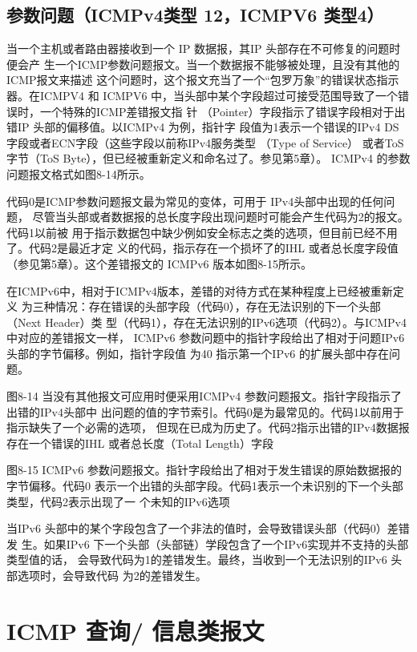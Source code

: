 \subsection{参数问题（ICMPv4类型 12，ICMPV6 类型4）}

当一个主机或者路由器接收到一个 IP 数据报，其IP 头部存在不可修复的问题时便会产
生一个ICMP参数问题报文。当一个数据报不能够被处理，且没有其他的ICMP报文来描述
这个问题时，这个报文充当了一个“包罗万象”的错误状态指示器。在ICMPV4 和 ICMPV6
中，当头部中某个字段超过可接受范围导致了一个错误时，一个特殊的ICMP差错报文指
针 （Pointer）字段指示了错误字段相对于出错IP 头部的偏移值。以ICMPv4 为例，指针字
段值为1表示一个错误的IPv4 DS 字段或者ECN字段（这些字段以前称IPv4服务类型
（Type of Service） 或者ToS 字节（ToS Byte），但已经被重新定义和命名过了。参见第5章）。
ICMPv4 的参数问题报文格式如图8-14所示。

代码0是ICMP参数问题报文最为常见的变体，可用于 IPv4头部中出现的任何问题，
尽管当头部或者数据报的总长度字段出现问题时可能会产生代码为2的报文。代码1以前被
用于指示数据包中缺少例如安全标志之类的选项，但目前已经不用了。代码2是最近才定
义的代码，指示存在一个损坏了的IHL 或者总长度字段值（参见第5章）。这个差错报文的
ICMPv6 版本如图8-15所示。

在ICMPv6中，相对于ICMPv4版本，差错的对待方式在某种程度上已经被重新定义
为三种情况：存在错误的头部字段（代码0），存在无法识别的下一个头部（Next Header）类
型（代码1），存在无法识别的IPv6选项（代码2）。与ICMPv4中对应的差错报文一样，
ICMPv6 参数问题中的指针字段给出了相对于问题IPv6 头部的字节偏移。例如，指针字段值
为40 指示第一个IPv6 的扩展头部中存在问题。

图8-14 当没有其他报文可应用时便采用ICMPv4 参数问题报文。指针字段指示了出错的IPv4头部中
出问题的值的字节索引。代码0是为最常见的。代码1以前用于指示缺失了一个必需的选项，
但现在已成为历史了。代码2指示出错的IPv4数据报存在一个错误的IHL 或者总长度（Total
Length）字段

图8-15 ICMPv6 参数问题报文。指针字段给出了相对于发生错误的原始数据报的字节偏移。代码0
表示一个出错的头部字段。代码1表示一个未识别的下一个头部类型，代码2表示出现了一
个未知的IPv6选项

当IPv6 头部中的某个字段包含了一个非法的值时，会导致错误头部（代码0）差错发
生。如果IPv6 下一个头部（头部链）学段包含了一个IPv6实现并不支持的头部类型值的话，
会导致代码为1的差错发生。最终，当收到一个无法识别的IPv6 头部选项时，会导致代码
为2的差错发生。

\section{ICMP 查询/ 信息类报文}

